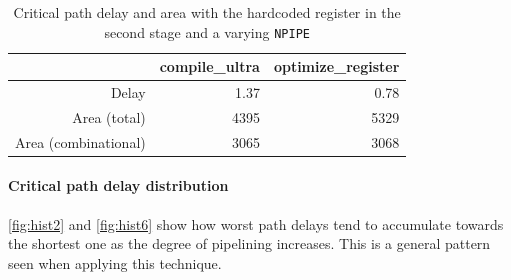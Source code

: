 \begin{table}[htbp]
	\centering
	\begin{tabular}{|r|r|r|}
		\hline
								& compile\_ultra 	& optimize\_register \\\hline
		Delay            		& 1.37				& 0.78  \\\hline
		Area (total)        	& 4395 				& 5329   \\\hline
		Area (combinational)	& 3065 				& 3068   \\\hline
	\end{tabular}
	\caption{Critical path delay and area with the hardcoded register in the second stage and a varying \texttt{NPIPE}}
	\label{tab:stage2_opt_vs_ultra}
\end{table}

\paragraph{Critical path delay distribution}
\autoref{fig:hist2} and \autoref{fig:hist6} show how worst path delays tend to accumulate towards the shortest one as the degree of pipelining increases. This is a general pattern seen when applying this technique.
